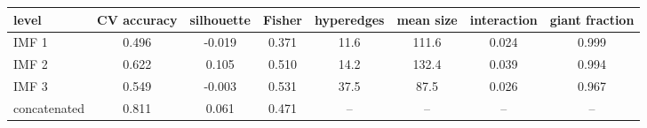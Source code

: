\begin{tabular}{lccccccc}
\toprule
level & CV accuracy & silhouette & Fisher & hyperedges & mean size & interaction & giant fraction \\
\midrule
IMF 1 & 0.496 & -0.019 & 0.371 & 11.6 & 111.6 & 0.024 & 0.999 \\
IMF 2 & 0.622 & 0.105 & 0.510 & 14.2 & 132.4 & 0.039 & 0.994 \\
IMF 3 & 0.549 & -0.003 & 0.531 & 37.5 & 87.5 & 0.026 & 0.967 \\
concatenated & 0.811 & 0.061 & 0.471 & -- & -- & -- & -- \\
\bottomrule
\end{tabular}
